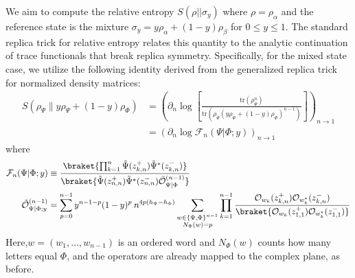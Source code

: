 \documentclass[11pt]{article}
\newcommand{\mO}{\mathcal{O}}
\newcommand{\nn}{\nonumber}
\newcommand{\lb}{\left(}
\newcommand{\rb}{\right)}
\begin{document}
  

  We aim to compute the relative entropy $S(\rho || \sigma_{y})$ where
  $\rho = \rho_{\alpha}$ and the reference state is the mixture
  $\sigma_{y}= y\rho_{\alpha}+(1-y) \rho_{\beta}$ for $0\leq y\leq 1$. The standard
  replica trick for relative entropy relates this quantity to the analytic continuation
  of trace functionals that break replica symmetry. Specifically, for the mixed state
  case, we utilize the following identity derived from the generalized replica
  trick for normalized density matrices:
\begin{align}
    S\left(\rho_\Psi \Big\| y\rho_\Psi+(1-y)\rho_\Phi\right)&=\lb \partial_{n}
    \log \left[ \frac{\text{tr}(\rho_{\Psi}^{n})}{\text{tr}(\rho_{\Psi}(y\rho_{\Psi}+(1-y)\rho_{\Phi})^{n-1})}
    \right]\rb_{n\to 1}\nn\\
    &=\lb \partial_n\log\mathcal{F}_n(\Psi|\Phi;y)\rb_{n\to 1}
\end{align}
where
\begin{align}
    \mathcal{F}_n(\Psi|\Phi;y)&\equiv 
    \frac{\braket{\prod_{k=1}^{n} \tilde\Psi(z^+_{k,n})\tilde\Psi^*(z^-_{k,n})}}{\braket{\tilde\Psi(z^+_{n,n})\tilde\Psi^*(z^-_{n,n})\tilde{\mO}^{(n-1)}_{\Psi|\Phi}}}\nn\\
    \tilde{\mO}_{\Psi|\Phi;y}^{(n-1)}&=\sum_{p=0}^{n-1}y^{n-1-p}(1-y)^p\: n^{4p(h_\Psi-h_\Phi)}
    \sum_{\substack{w\in\{\Psi,\Phi\}^{n-1}\\ N_\Phi(w)=p}} \prod_{k=1}^{n-1}\frac{\mO_{w_k}(z_{k,n}^{+})\mO_{w_k^*}(z_{k,n}^{-})}{\braket{\mO_{w_k}(z^+_{1,1})\mO_{w_k^*}(z^-_{1,1})}}
  \end{align} 
   Here,$w=(w_{1},\dots,w_{n-1})$ is an ordered word and $N_{\Phi}(w)$ counts how many letters equal $\Phi$, and the operators are already mapped to the complex plane, as before. 
\end{document}

